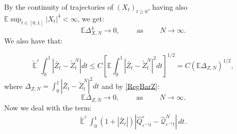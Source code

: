 \documentclass[reqno,a4paper,11 pt]{article}
\def \E {\mathbb{E}}
\def \e {\varepsilon}
\numberwithin{equation}{section}
\begin{document}
\noindent By the continuity of trajectories of $(X_t)_{t\geq 0}$, having also $\E \sup_{t\in [0,1]} |X_t|^4<\infty$,  we get: 
\begin{equation}\label{Delta1}
\E \Delta_{X,N}^4\rightarrow 0, \qquad \text{ as }\qquad N\rightarrow \infty.\end{equation} 
We also have that:

 \begin{equation}\label{stimabarZ}
\widetilde{\E}^\e\int_0^{1}  |\bar{Z}_{ t}-\widetilde{Z}^N_t|dt
\leq
C  \left[\E \int_0^{1} |\bar{Z}_{ t}-\widetilde{Z}^N_t|^2dt\right]^{1/2}= C (\E\Delta_{Z,N})^{1/2},
\end{equation}
where $\Delta_{Z,N}= \displaystyle \int_0^{1} |\bar{Z}_{ t}-\widetilde{Z}^N_t|^2dt$ and by  \eqref{RegBarZ}:
\begin{equation}\label{Delta2}
\E \Delta_{Z,N}\to 0, \qquad \text{ as }\qquad N\rightarrow \infty.\end{equation} 
Now we deal with  the term:
\begin{align*}
 \widetilde{\E}^{\e}  \, \int_0^{1} (1+|\bar{Z}_t|) |\hat{Q}^\e_{\e^{-1} t}-\hat{\mathcal{Q}}^N_{ \e^{-1} t}|\, dt .
\end{align*}
\end{document}
